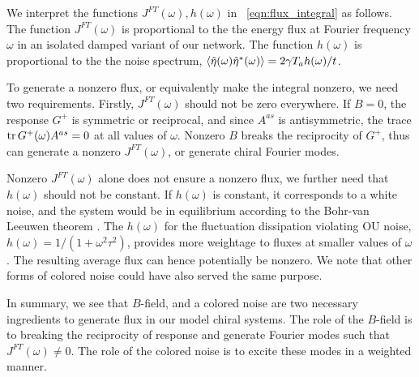 \documentclass[
 preprint,
 preprintnumbers,
 amsmath,amssymb,
 aps,
 pre,
 longbibliography,
 superscriptaddress,
 10pt, twocolumn
]{revtex4-1}
\begin{document}
We interpret the functions $J^{FT}(\omega), h(\omega)$ in \eqnname~\eqref{eqn:flux_integral} as follows.
The function $J^{FT}(\omega)$ is proportional to the the energy flux at Fourier frequency $\omega$ in an isolated damped variant of our network.
The function $h(\omega)$ is proportional to the the noise spectrum, $\expval{\tilde{\eta}(\omega)\tilde{\eta}^*(\omega)} = 2\gamma T_a h(\omega) / t$.

To generate a nonzero flux, or equivalently make the integral nonzero, we need two requirements.
Firstly, $J^{FT}(\omega)$ should not be zero everywhere.
If $B=0$, the response $G^+$ is symmetric or reciprocal, and since $A^{as}$ is antisymmetric, the trace $\tr G^+(\omega) A^{as}=0$ at all values of $\omega$. Nonzero $B$ breaks the reciprocity of $G^+$, thus can generate a nonzero $J^{FT}(\omega)$, or generate chiral Fourier modes.




Nonzero $J^{FT}(\omega)$ alone does not ensure a nonzero flux, we further need that $h(\omega)$ should not be constant.
If $h(\omega)$ is constant, it corresponds to a white noise, and the system would be in equilibrium according to the Bohr-van Leeuwen theorem \cite{Pradhan2010NonexistenceClassical}.
The $h(\omega)$ for the fluctuation dissipation violating OU noise, $h(\omega)=1/(1+\omega^2\tau^2)$, provides more weightage to fluxes at smaller values of $\omega$. The resulting average flux can hence potentially be nonzero. We note that other forms of colored noise could have also served the same purpose.

In summary, we see that $B$-field, and a colored noise are two necessary ingredients to generate flux in our model chiral systems. 
The role of the $B$-field is to breaking the reciprocity of response and generate Fourier modes such that $J^{FT}(\omega)\neq 0$. The role of the colored noise is to excite these modes in a weighted manner. 
\end{document}
